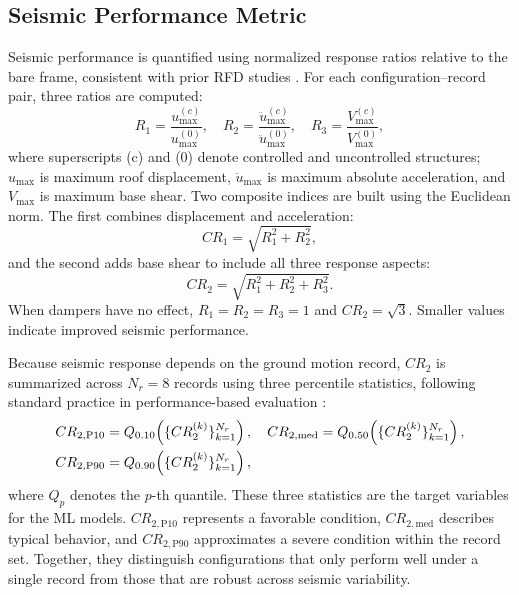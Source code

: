 \documentclass[preprint,12pt,authoryear]{elsarticle}
\newcommand{\CR}[1]{CR_{2,\text{#1}}}
\begin{document}
\subsection{Seismic Performance Metric}
\label{sec:theory:metrica}

Seismic performance is quantified using normalized response ratios relative to the bare
frame, consistent with prior RFD studies
\citep{Namorado2024, Jarrahi2020jbe, Mualla2002}. For each configuration--record pair,
three ratios are computed:
\begin{equation}
    R_1 = \frac{u_{\max}^{(c)}}{u_{\max}^{(0)}}, \quad
    R_2 = \frac{\ddot{u}_{\max}^{(c)}}{\ddot{u}_{\max}^{(0)}}, \quad
    R_3 = \frac{V_{\max}^{(c)}}{V_{\max}^{(0)}},
    \label{eq:R_individual}
\end{equation}
where superscripts (c) and (0) denote controlled and uncontrolled structures; $u_{\max}$
is maximum roof displacement, $\ddot{u}_{\max}$ is maximum absolute acceleration, and
$V_{\max}$ is maximum base shear. Two composite indices are built using the Euclidean
norm. The first combines displacement and acceleration:
\begin{equation}
    CR_1 = \sqrt{R_1^2 + R_2^2},
    \label{eq:CR1}
\end{equation}
and the second adds base shear to include all three response aspects:
\begin{equation}
    CR_2 = \sqrt{R_1^2 + R_2^2 + R_3^2}.
    \label{eq:CR2}
\end{equation}
When dampers have no effect, $R_1 = R_2 = R_3 = 1$ and $CR_2 = \sqrt{3}$. Smaller
values indicate improved seismic performance.

Because seismic response depends on the ground motion record, $CR_2$ is summarized
across $N_r = 8$ records using three percentile statistics, following standard practice
in performance-based evaluation \citep{Kazemi2022}:
\begin{align}
    \CR{P10} &= Q_{0.10}\!\left(\{CR_2^{(k)}\}_{k=1}^{N_r}\right), \quad
    \CR{med}  = Q_{0.50}\!\left(\{CR_2^{(k)}\}_{k=1}^{N_r}\right), \notag\\
    \CR{P90} &= Q_{0.90}\!\left(\{CR_2^{(k)}\}_{k=1}^{N_r}\right),
    \label{eq:CR2stats}
\end{align}
where $Q_p$ denotes the $p$-th quantile. These three statistics are the target variables
for the ML models. $\CR{P10}$ represents a favorable condition, $\CR{med}$ describes
typical behavior, and $\CR{P90}$ approximates a severe condition within the record set.
Together, they distinguish configurations that only perform well under a single record
from those that are robust across seismic variability.
\end{document}
